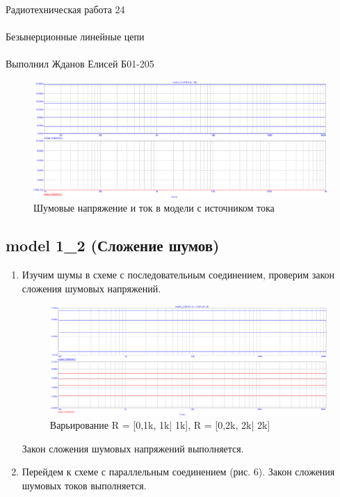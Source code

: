 \documentclass{astroedu-lab}
\begin{document}
\begin{problem}{\huge Радиотехническая работа 24\\\\Безынерционные линейные цепи\\\\Выполнил Жданов Елисей Б01-205}
\begin{enumerate}
\begin{figure}[h!]
    \centering
    \includegraphics[scale=0.3]{images/mod1_1_3.png}
    \caption{Шумовые напряжение и ток в модели с источником тока}
    \label{fig:R3}
\end{figure}

\end{enumerate}

\subsection*{\textbf{model 1\_2 (Сложение шумов)}}

\begin{enumerate}

\item

Изучим шумы в схеме с последовательным соединением, проверим закон сложения шумовых напряжений.

\begin{figure}[h!]
    \centering
    \includegraphics[scale=0.3]{images/mod1_2_1.png}
    \caption{Варьирование R = [0,1k, 1k| 1k], R = [0,2k, 2k| 2k]}
    \label{fig:1_2_1}
\end{figure}

Закон сложения шумовых напряжений выполняется.

\item
 
Перейдем к схеме с параллельным соединением (рис. 6). Закон сложения шумовых токов выполняется.


\end{enumerate}
\end{problem}
\end{document}

